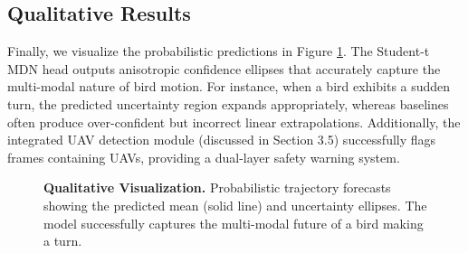 \documentclass[11pt]{article}
\begin{document}
\subsection{Qualitative Results}
Finally, we visualize the probabilistic predictions in Figure \ref{fig:qualitative}. The Student-t MDN head outputs anisotropic confidence ellipses that accurately capture the multi-modal nature of bird motion. For instance, when a bird exhibits a sudden turn, the predicted uncertainty region expands appropriately, whereas baselines often produce over-confident but incorrect linear extrapolations. Additionally, the integrated UAV detection module (discussed in Section 3.5) successfully flags frames containing UAVs, providing a dual-layer safety warning system.

\begin{figure}[h]
	\centering
	\caption{\textbf{Qualitative Visualization.} Probabilistic trajectory forecasts showing the predicted mean (solid line) and uncertainty ellipses. The model successfully captures the multi-modal future of a bird making a turn.}
	\label{fig:qualitative}
\end{figure}
\end{document}

